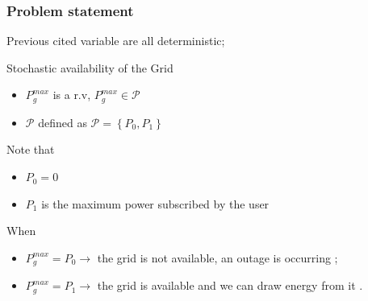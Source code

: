 \documentclass{beamer}
\begin{document}
\begin{frame}
\frametitle{Problem statement}
{\large Previous cited variable are all deterministic};
\vspace{15px}

{\large Stochastic availability of the Grid}  \\
\vspace{7px}
\begin{itemize}
    \item $P_g^{max}$ is a r.v, $P_g^{max} \in \mathcal{P}$
    \item $\mathcal{P}$ defined as $ \mathcal{P} = \left \{ P_0 , P_1\right \}$
\end{itemize}

\vspace{15px}
{\large Note that }
\begin{itemize}
    \item $P_0 = 0$ 
    \item $P_1$ is the maximum power subscribed by the user
\end{itemize}

\vspace{15px}
{\large When}
\begin{itemize}
\item $P_g^{max} = P_0 \rightarrow$ the grid is not available, an outage is occurring ; 
\item $P_g^{max} = P_1 \rightarrow$ the grid is available and we can draw energy from it . 
\end{itemize}
\end{frame}
\endgroup
\end{document}
